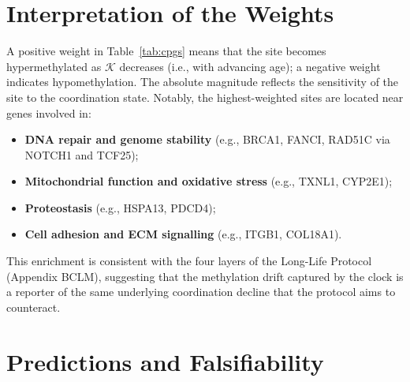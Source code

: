 \documentclass[12pt,a4paper]{article}
\newcommand{\REL}{\mathcal{K}}          %
\begin{document}
	\section{Interpretation of the Weights}
	\label{sec:weights}
	A positive weight in Table~\ref{tab:cpgs} means that the site becomes hypermethylated as \(\REL\) decreases (i.e., with advancing age); a negative weight indicates hypomethylation. The absolute magnitude reflects the sensitivity of the site to the coordination state. Notably, the highest-weighted sites are located near genes involved in:
	\begin{itemize}
		\item \textbf{DNA repair and genome stability} (e.g., BRCA1, FANCI, RAD51C via NOTCH1 and TCF25);
		\item \textbf{Mitochondrial function and oxidative stress} (e.g., TXNL1, CYP2E1);
		\item \textbf{Proteostasis} (e.g., HSPA13, PDCD4);
		\item \textbf{Cell adhesion and ECM signalling} (e.g., ITGB1, COL18A1).
	\end{itemize}
	This enrichment is consistent with the four layers of the Long-Life Protocol (Appendix BCLM), suggesting that the methylation drift captured by the clock is a reporter of the same underlying coordination decline that the protocol aims to counteract.
	
	\section{Predictions and Falsifiability}
	\label{sec:predictions}
	
\end{document}
